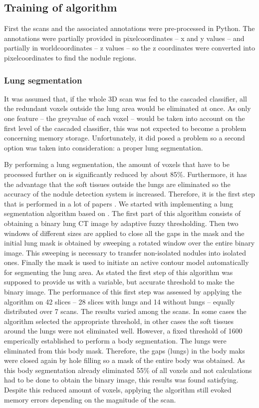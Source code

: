 \subsection{Training of algorithm}
First the scans and the associated annotations were pre-processed in Python. The
annotations were partially provided in pixelcoordinates -- x and y values -- and
partially in worldcoordinates -- z values -- so the z coordinates were converted
into pixelcoordinates to find the nodule regions.


\subsubsection{Lung segmentation}
It was assumed that, if the whole 3D scan was fed to the cascaded
classifier, all the redundant voxels outside the lung area would be eliminated
at once. As only one feature -- the greyvalue of each voxel -- would be taken
into account on the first level of the cascaded classifier, this was not
expected to become a problem concerning memory storage. Unfortunately, it did
posed a problem so a second option was taken into consideration: a proper
lung segmentation.

By performing a lung segmentation, the amount of voxels that have to be
processed further on is significantly reduced by about 85\%. Furthermore, it has
the advantage that the soft tissues outside the lungs are eliminated so the
accuracy of the nodule detection system is increased. Therefore, it is the first
step that is performed in a lot of papers \cite{keshani, elbaz, teramoto}. We
started with implementing a lung segmentation algorithm based on \cite{keshani}.
The first part of this algorithm consists of obtaining a binary lung CT image by
adaptive fuzzy thresholding. Then two windows of different sizes are applied to
close all the gaps in the mask and the initial lung mask is obtained by sweeping
a rotated window over the entire binary image. This sweeping is necessary to
transfer non-isolated nodules into isolated ones. Finally the mask is used to
initiate an active contour model automatically for segmenting the lung area. As
stated the first step of this algorithm was supposed to provide us with a
variable, but accurate threshold to make the binary image. The performance of
this first step was assessed by applying the algorithm on 42 slices -- 28 slices
with lungs and 14 without lungs -- equally distributed over 7 scans. The results
varied among the scans. In some cases the algorithm selected the appropriate
threshold, in other cases the soft tissues around the lungs were not eliminated
well. However, a fixed threshold of 1600 emperically established to perform a
body segmentation. The lungs were eliminated from this body mask. Therefore, the
gaps (lungs) in the body maks were closed again by hole filling so a mask of the
entire body was obtained. As this body segmentation already eliminated 55\% of
all voxels and not calculations had to be done to obtain the binary image, this
results was found satisfying. Despite this reduced amount of voxels, applying
the algorithm still evoked memory errors depending on the magnitude of the scan.

